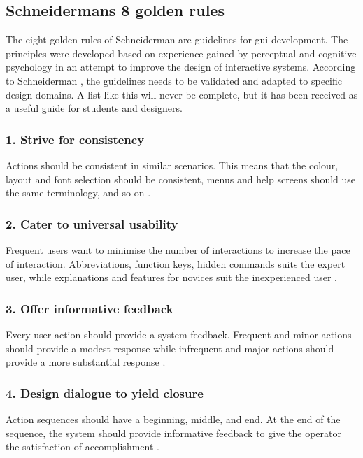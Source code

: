 \subsection{Schneidermans 8 golden rules}
\label{sec:schneiderman}
The eight golden rules of Schneiderman are guidelines for \acrshort{gui} development. The principles were developed based on experience gained by perceptual and cognitive psychology in an attempt to improve the design of interactive systems. According to Schneiderman \cite{schneiderman}, the guidelines needs to be validated and adapted to specific design domains. A list like this will never be complete, but it has been received as a useful guide for students and designers.

\subsubsection{1. Strive for consistency}
Actions should be consistent in similar scenarios. This means that the colour, layout and font selection should be consistent, menus and help screens should use the same terminology, and so on \cite{schneiderman}.

\subsubsection{2. Cater to universal usability}
Frequent users want to minimise the number of interactions to increase the pace of interaction. Abbreviations, function keys, hidden commands suits the expert user, while explanations and features for novices suit the inexperienced user \cite{schneiderman}.

\subsubsection{3. Offer informative feedback}
Every user action should provide a system feedback. Frequent and minor actions should provide a modest response while infrequent and major actions should provide a more substantial response \cite{schneiderman}.

\subsubsection{4. Design dialogue to yield closure}
Action sequences should have a beginning, middle, and end. At the end of the sequence, the system should provide informative feedback to give the operator the satisfaction of accomplishment \cite{schneiderman}.

